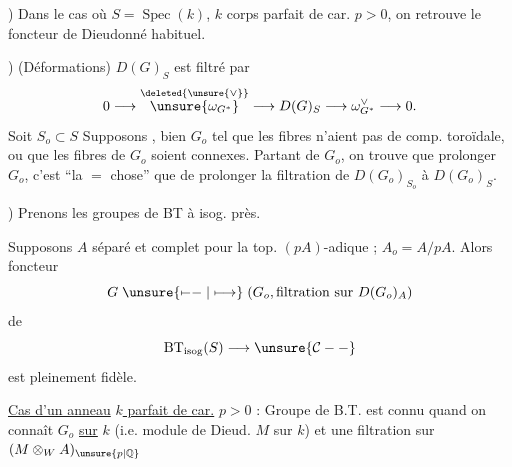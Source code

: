) Dans le cas où $S=\operatorname{Spec}(k)$, $k$ corps parfait de car. $p>0$, on retrouve le foncteur de Dieudonné habituel.

) (Déformations) $D(G)_S$ est filtré par
\[
0\longrightarrow\overset{\deleted{\unsure{\vee}}}{\unsure{\omega_{G^*}}}\longrightarrow D(G)_S\longrightarrow\omega_{G^*}^{\vee}\longrightarrow0.
\]
Soit $S_o\subset S$
Supposons  ,  bien  $G_o$ tel que les fibres n'aient pas de comp. toroïdale, ou que les fibres de $G_o$ soient connexes. Partant de $G_o$, on trouve que prolonger $G_o$, c'est ``la $=$ chose'' que de prolonger la filtration de $D(G_o)_{S_o}$ à $D(G_o)_S$.

) Prenons les groupes de BT à isog. près.

Supposons $A$ séparé et complet pour la top. $(pA)$-adique ; $A_o=A/pA$. Alors foncteur
\[
G\mathrel{\unsure{\mapstochar\relbar\relbar|\longmapsto}}(G_o,\text{filtration sur }D(G_o)_A)
\]
de
\[
\mathrm{BT}_{\mathrm{isog}}(S)\longrightarrow\unsure{\mathcal C--}
\]
est pleinement fidèle.

\uline{Cas d'un anneau}   \uline{$k$ parfait de car.} $p>0$ : Groupe de B.T. est connu  quand on connaît $G_o$ \uline{sur} $k$ (i.e. module de Dieud. $M$ sur $k$) et une filtration sur $(M\otimes_W A)_{\unsure{p|\mathbb Q}}$

